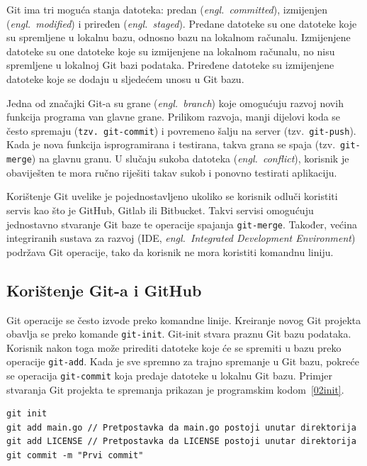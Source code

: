 Git ima tri moguća stanja datoteka: predan (\textit{engl.~committed}), izmijenjen
(\textit{engl.~modified}) i priređen (\textit{engl.~staged}). Predane datoteke su one datoteke koje
su spremljene u lokalnu bazu, odnosno bazu na lokalnom računalu. Izmijenjene datoteke su one
datoteke koje su izmijenjene na lokalnom računalu, no nisu spremljene u lokalnoj Git bazi podataka.
Priređene datoteke su izmijenjene datoteke koje se dodaju u sljedećem unosu u Git bazu.

Jedna od značajki Git-a su grane (\textit{engl.~branch}) koje omogućuju razvoj novih funkcija
programa van glavne grane. Prilikom razvoja, manji dijelovi koda se često spremaju (\texttt{tzv.
git-commit}) i povremeno šalju na server (tzv.~\texttt{git-push}). Kada je nova funkcija
isprogramirana i testirana, takva grana se spaja (tzv.~\texttt{git-merge}) na glavnu granu. U
slučaju sukoba datoteka (\textit{engl.~conflict}), korisnik je obaviješten te mora ručno riješiti
takav sukob i ponovno testirati aplikaciju.

Korištenje Git uvelike je pojednostavljeno ukoliko se korisnik odluči koristiti servis kao što je
GitHub, Gitlab ili Bitbucket. Takvi servisi omogućuju jednostavno stvaranje Git baze te operacije
spajanja \texttt{git-merge}. Također, većina integriranih sustava za razvoj (IDE,
\textit{engl.~Integrated Development Environment}) podržava Git operacije, tako da korisnik ne mora
koristiti komandnu liniju.

\subsection{Korištenje Git-a i GitHub} Git operacije se često izvode preko komandne linije.
Kreiranje novog Git projekta obavlja se preko komande \texttt{git-init}. Git-init stvara praznu Git
bazu podataka. Korisnik nakon toga može prirediti datoteke koje će se spremiti u bazu preko
operacije \texttt{git-add}. Kada je sve spremno za trajno spremanje u Git bazu, pokreće se operacija
\texttt{git-commit} koja predaje datoteke u lokalnu Git bazu. Primjer stvaranja Git projekta te
spremanja prikazan je programskim kodom~\ref{02init}.

\begin{lstlisting}[float=h]
git init
git add main.go // Pretpostavka da main.go postoji unutar direktorija
git add LICENSE // Pretpostavka da LICENSE postoji unutar direktorija
git commit -m "Prvi commit"
\end{lstlisting}


